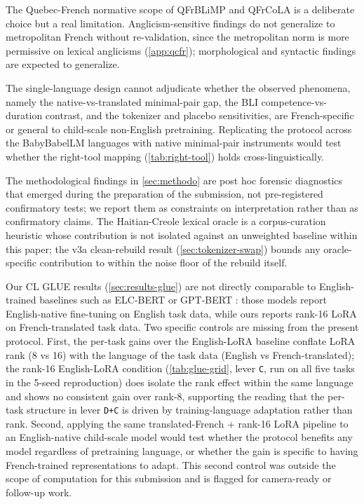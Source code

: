 \documentclass[11pt]{article}
\begin{document}
The Quebec-French normative scope of QFrBLiMP and QFrCoLA is a deliberate choice but a real limitation. Anglicism-sensitive findings do not generalize to metropolitan French without re-validation, since the metropolitan norm is more permissive on lexical anglicisms (\autoref{app:qcfr}); morphological and syntactic findings are expected to generalize.

The single-language design cannot adjudicate whether the observed phenomena, namely the native-vs-translated minimal-pair gap, the BLI competence-vs-duration contrast, and the tokenizer and placebo sensitivities, are French-specific or general to child-scale non-English pretraining. Replicating the protocol across the BabyBabelLM languages \citep{jumelet2026babelm} with native minimal-pair instruments would test whether the right-tool mapping (\autoref{tab:right-tool}) holds cross-linguistically.

The methodological findings in \autoref{sec:methodo} are post hoc forensic diagnostics that emerged during the preparation of the submission, not pre-registered confirmatory tests; we report them as constraints on interpretation rather than as confirmatory claims. The Haitian-Creole lexical oracle is a corpus-curation heuristic whose contribution is not isolated against an unweighted baseline within this paper; the v3a clean-rebuild result (\autoref{sec:tokenizer-swap}) bounds any oracle-specific contribution to within the noise floor of the rebuild itself.

Our CL GLUE results (\autoref{sec:results-glue}) are not directly comparable to English-trained baselines such as ELC-BERT or GPT-BERT \citep{charpentier2023elcbert,charpentier2024gptbert}: those models report English-native fine-tuning on English task data, while ours reports rank-16 LoRA on French-translated task data. Two specific controls are missing from the present protocol. First, the per-task gains over the English-LoRA baseline conflate LoRA rank (8 vs 16) with the language of the task data (English vs French-translated); the rank-16 English-LoRA condition (\autoref{tab:glue-grid}, lever \texttt{C}, run on all five tasks in the 5-seed reproduction) does isolate the rank effect within the same language and shows no consistent gain over rank-8, supporting the reading that the per-task structure in lever \texttt{D+C} is driven by training-language adaptation rather than rank. Second, applying the same translated-French + rank-16 LoRA pipeline to an English-native child-scale model would test whether the protocol benefits any model regardless of pretraining language, or whether the gain is specific to having French-trained representations to adapt. This second control was outside the scope of computation for this submission and is flagged for camera-ready or follow-up work.
\end{document}

